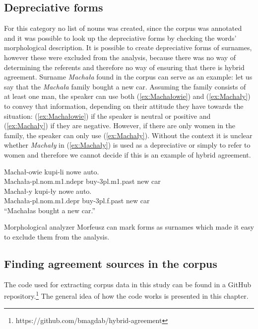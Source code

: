 \subsection{Depreciative forms}
For this category no list of nouns was created, since the corpus was annotated and it was possible to look up the depreciative forms by checking the words' morphological description. It is possible to create depreciative forms of surnames, however these were excluded from the analysis, because there was no way of determining the referents and therefore no way of ensuring that there is hybrid agreement. Surname \textsl{Machała} found in the corpus can serve as an example: let us say that the \textsl{Machała} family bought a new car. Assuming the family consists of at least one man, the speaker can use both (\ref{ex:Machałowie}) and (\ref{ex:Machały}) to convey that information, depending on their attitude they have towards the situation: (\ref{ex:Machałowie}) if the speaker is neutral or positive and (\ref{ex:Machały}) if they are negative. However, if there are only women in the family, the speaker can only use (\ref{ex:Machały}). Without the context it is unclear whether \textsl{Machały} in (\ref{ex:Machały}) is used as a depreciative or simply to refer to women and therefore we cannot decide if this is an example of hybrid agreement.

\begin{exe}
  \ex
  \begin{xlist}
    \ex\label{ex:Machałowie}
    \gll Machał-owie kupi-li nowe auto.\\
    Machała-pl.nom.m1.ndepr buy-3pl.m1.past new car\\
    \ex\label{ex:Machały}
    \gll Machał-y kupi-ły nowe auto.\\
    Machała-pl.nom.m1.depr buy-3pl.f.past new car\\
    \trans ``Machałas bought a new car.''
  \end{xlist}
\end{exe}

Morphological analyzer Morfeusz \citep{kieras_morfeusz_2017} can mark forms as surnames which made it easy to exclude them from the analysis. 

\subsection{Finding agreement sources in the corpus}
The code used for extracting corpus data in this study can be found in a GitHub repository.\footnote{https://github.com/bmagdab/hybrid-agreement} The general idea of how the code works is presented in this chapter.


